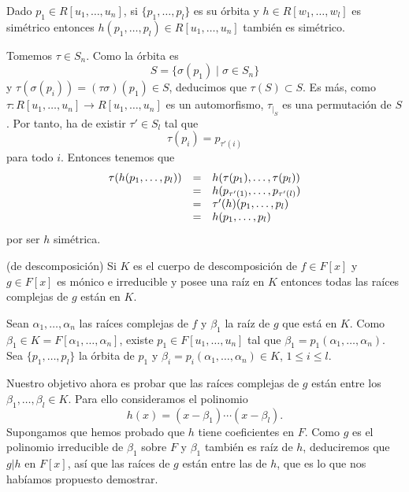 
Dado \(p_1\in R[u_1,\dots,u_n]\), si \(\{p_1,\dots,p_l\}\) es su
órbita y \(h\in R[w_1,\dots,w_l]\) es simétrico entonces
\(h(p_1,\dots,p_l)\in R[u_1,\dots,u_n]\) también es simétrico.


Tomemos \(\tau\in S_n\). Como la órbita es
\[S=\{\sigma(p_1) \mid \sigma\in S_n\}\] y
\(\tau(\sigma(p_i))=(\tau\sigma)(p_1)\in S\), deducimos que
\(\tau(S)\subset S\). Es más, como
\(\tau\colon R[u_1,\dots,u_n]\rightarrow R[u_1,\dots,u_n]\) es un
automorfismo, \(\tau_{|_S}\) es una permutación de \(S\). Por tanto,
ha de existir \(\tau'\in S_l\) tal que \[\tau(p_i)=p_{\tau'(i)}\] para
todo \(i\). Entonces tenemos que \[
\begin{array}{rcl}
\tau(h(p_1,\dots,p_l))&=&h(\tau(p_1),\dots,\tau(p_l))\cr
&=&h(p_{\tau'(1)},\dots,p_{\tau'(l)})\cr
&=&\tau'(h)(p_1,\dots,p_l)\cr
&=&h(p_1,\dots,p_l)
\end{array}
\] por ser \(h\) simétrica. 

\textrm{\normalfont (de descomposición)} Si \(K\) es el
cuerpo de descomposición de \(f\in F[x]\) y \(g\in F[x]\) es mónico e
irreducible y posee una raíz en \(K\) entonces todas las raíces
complejas de \(g\) están en \(K\). 


Sean \(\alpha_1,\dots,\alpha_n\) las raíces complejas de \(f\) y
\(\beta_1\) la raíz de \(g\) que está en \(K\). Como
\(\beta_1\in K=F[\alpha_1,\dots,\alpha_n]\), existe
\(p_1\in F[u_1,\dots,u_n]\) tal que
\(\beta_1=p_1(\alpha_1,\dots,\alpha_n)\). Sea
\(\{p_1,\dots,p_l\}\) la órbita de \(p_1\) y
\(\beta_i=p_i(\alpha_1,\dots,\alpha_n)\in K\), \(1\leq i\leq l\).

Nuestro objetivo ahora es probar que las raíces complejas de \(g\) están
entre los \(\beta_1,\dots,\beta_l\in K\). Para ello consideramos el
polinomio \[h(x)=(x-\beta_1)\cdots (x-\beta_l).\] Supongamos que hemos
probado que \(h\) tiene coeficientes en \(F\). Como \(g\) es el
polinomio irreducible de \(\beta_1\) sobre \(F\) y \(\beta_1\) también
es raíz de \(h\), deduciremos que \(g|h\) en \(F[x]\), así que las
raíces de \(g\) están entre las de \(h\), que es lo que nos habíamos
propuesto demostrar.

